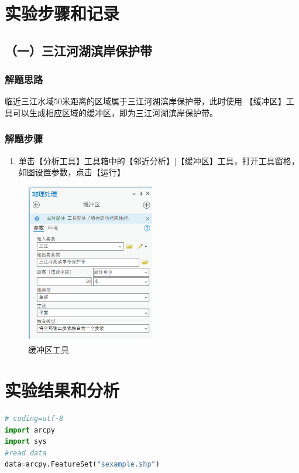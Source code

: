 \documentclass{zjureport}
\begin{document}
\section{实验步骤和记录}
\subsection{（一）三江河湖滨岸保护带}
\subsubsection{解题思路}临近三江水域50米距离的区域属于三江河湖滨岸保护带，此时使用
【缓冲区】工具可以生成相应区域的缓冲区，即为三江河湖滨岸保护带。

\subsubsection{解题步骤}
\begin{enumerate}
    \item 单击【分析工具】工具箱中的【邻近分析】|【缓冲区】工具，打开工具窗格，如图设置参数，点击【运行】
\end{enumerate}

\begin{figure}[H]
    \centering
    \includegraphics[width=0.5\textwidth]{image/example.png}
    \caption{缓冲区工具}
    \label{fig:buffer}
\end{figure}

\section{实验结果和分析}

\begin{lstlisting}[language=python]
# coding=utf-8
import arcpy
import sys
#read data
data=arcpy.FeatureSet("sexample.shp")
\end{lstlisting}
\end{document}
